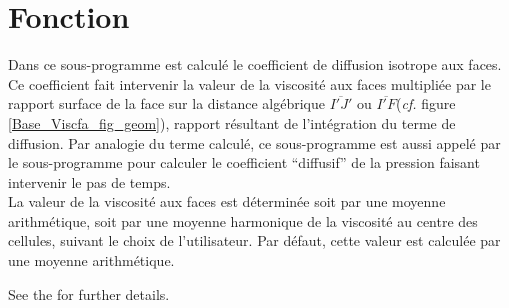 
%
%
%
%


%

\hypertarget{cs\_face\_viscosity}{}

\vspace{1cm}
\section*{Fonction}
Dans ce sous-programme est calculé le coefficient de diffusion isotrope aux
faces. Ce coefficient fait intervenir la valeur de la viscosité aux faces
multipliée par le rapport surface de la face sur la distance algébrique
$\overline{I'J'}$ ou $\overline{I'F}$({\it cf.} figure
\ref{Base_Viscfa_fig_geom}), rapport résultant de l'intégration du terme de
diffusion.  Par analogie du terme calculé, ce sous-programme est aussi appelé
par le sous-programme  pour calculer le coefficient ``diffusif''
de la pression faisant intervenir le pas de temps.\\
La valeur de la viscosité aux faces est déterminée soit par une moyenne
arithmétique, soit par une moyenne harmonique de la viscosité au centre des
cellules, suivant le choix de l'utilisateur. Par défaut, cette valeur est
calculée par une moyenne arithmétique.

See the 
for further details.

